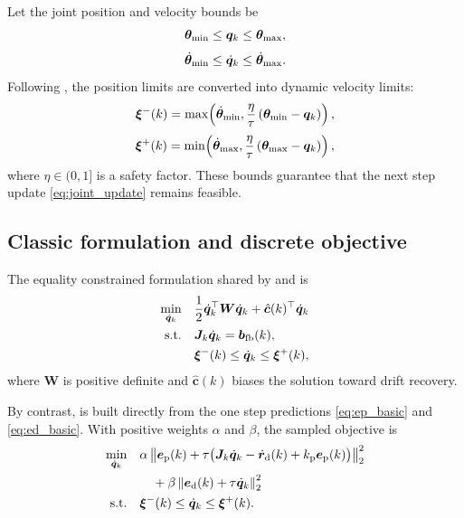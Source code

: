 Let the joint position and velocity bounds be
\begin{equation}
  \bm{\theta}_{\min} \le \bm{q}_k \le \bm{\theta}_{\max},
\end{equation}
\begin{equation}
  \dot{\bm{\theta}}_{\min} \le \dot{\bm{q}}_k \le \dot{\bm{\theta}}_{\max}.
\end{equation}
Following \citet{zhang2009rmp}, the position limits are converted into dynamic velocity limits:
\begin{equation}
  \bm{\xi}^{-}(k) =
  \max\!\left(
    \dot{\bm{\theta}}_{\min},
    \frac{\eta}{\tau}\left( \bm{\theta}_{\min} - \bm{q}_k \right)
  \right),
\end{equation}
\begin{equation}
  \bm{\xi}^{+}(k) =
  \min\!\left(
    \dot{\bm{\theta}}_{\max},
    \frac{\eta}{\tau}\left( \bm{\theta}_{\max} - \bm{q}_k \right)
  \right),
\end{equation}
where $\eta \in (0,1]$ is a safety factor. These bounds guarantee that the next step update \eqref{eq:joint_update} remains feasible.

\subsection{Classic formulation and discrete objective}

The equality constrained formulation shared by \methodone{} and \methodtwo{} is
\begin{equation}
  \begin{aligned}
    \min_{\dot{\bm{q}}_k} \quad &
      \frac{1}{2}\dot{\bm{q}}_k^\top \bm{W}\dot{\bm{q}}_k + \hat{\bm{c}}(k)^\top \dot{\bm{q}}_k \\
    \text{s.t.} \quad &
      \bm{J}_k \dot{\bm{q}}_k = \bm{b}_{\mathrm{fb}}(k), \\
    &
      \bm{\xi}^{-}(k) \le \dot{\bm{q}}_k \le \bm{\xi}^{+}(k),
  \end{aligned}
  \label{eq:classical_qp_shell}
\end{equation}
where $\bm{W}$ is positive definite and $\hat{\bm{c}}(k)$ biases the solution toward drift recovery.

By contrast, \methodthree{} is built directly from the one step predictions \eqref{eq:ep_basic} and \eqref{eq:ed_basic}. With positive weights $\alpha$ and $\beta$, the sampled objective is
\begin{equation}
  \begin{aligned}
    \min_{\dot{\bm{q}}_k} \quad &
      \alpha
      \left\|
        \bm{e}_{\mathrm{p}}(k) + \tau\bigl(\bm{J}_k\dot{\bm{q}}_k - \dot{\bm{r}}_{\mathrm{d}}(k) + k_{\mathrm{p}}\bm{e}_{\mathrm{p}}(k)\bigr)
      \right\|_2^2 \\
      & \quad +
      \beta
      \left\|
        \bm{e}_{\mathrm{d}}(k) + \tau \dot{\bm{q}}_k
      \right\|_2^2 \\
    \text{s.t.} \quad &
      \bm{\xi}^{-}(k) \le \dot{\bm{q}}_k \le \bm{\xi}^{+}(k).
  \end{aligned}
  \label{eq:method3_original}
\end{equation}

